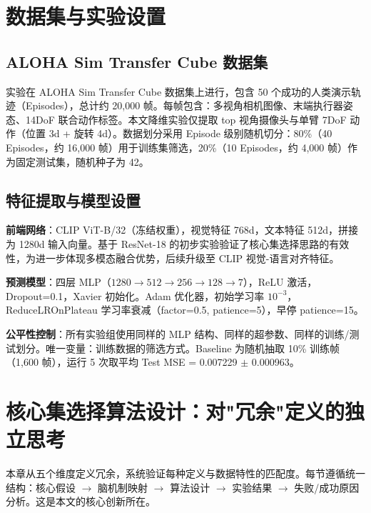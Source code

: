 \documentclass[12pt,a4paper]{article}
\begin{document}
\section{数据集与实验设置}
\label{sec:dataset}

\subsection{ALOHA Sim Transfer Cube 数据集}

实验在 ALOHA Sim Transfer Cube 数据集上进行\cite{zhao2023act}，包含 50 个成功的人类演示轨迹（Episodes），总计约 20,000 帧。每帧包含：多视角相机图像、末端执行器姿态、14DoF 联合动作标签。本文降维实验仅提取 top 视角摄像头与单臂 7DoF 动作（位置 3d + 旋转 4d）。数据划分采用 Episode 级别随机切分：80\%（40 Episodes，约 16,000 帧）用于训练集筛选，20\%（10 Episodes，约 4,000 帧）作为固定测试集，随机种子为 42。

\subsection{特征提取与模型设置}

\textbf{前端网络}：CLIP ViT-B/32（冻结权重）\cite{radford2021clip}，视觉特征 768d，文本特征 512d，拼接为 1280d 输入向量。基于 ResNet-18 的初步实验验证了核心集选择思路的有效性\cite{he2016resnet}，为进一步体现多模态融合优势，后续升级至 CLIP 视觉-语言对齐特征。

\textbf{预测模型}：四层 MLP（$1280 \rightarrow 512 \rightarrow 256 \rightarrow 128 \rightarrow 7$），ReLU 激活，Dropout=0.1，Xavier 初始化。Adam 优化器，初始学习率 $10^{-3}$，ReduceLROnPlateau 学习率衰减（factor=0.5, patience=5），早停 patience=15。

\textbf{公平性控制}：所有实验组使用同样的 MLP 结构、同样的超参数、同样的训练/测试划分。唯一变量：训练数据的筛选方式。Baseline 为随机抽取 10\% 训练帧（1,600 帧），运行 5 次取平均 Test MSE = 0.007229 $\pm$ 0.000963。

\section{核心集选择算法设计：对"冗余"定义的独立思考}
\label{sec:coreset}

本章从五个维度定义冗余，系统验证每种定义与数据特性的匹配度。每节遵循统一结构：核心假设 $\rightarrow$ 脑机制映射 $\rightarrow$ 算法设计 $\rightarrow$ 实验结果 $\rightarrow$ 失败/成功原因分析。这是本文的核心创新所在。
\end{document}
